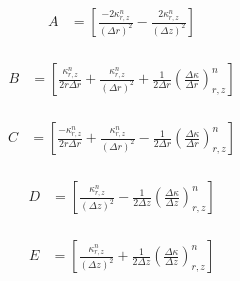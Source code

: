 \documentclass[12pt]{article}
\begin{document}
		
		\begin{equation}
		\begin{aligned}
		A &= \left [\frac{-2\kappa^n_{r, z}}{(\Delta r)^2} -\frac{2\kappa^n_{r, z}}{(\Delta z)^2}  \right ] \\
		\end{aligned}
		\end{equation}
		
		\begin{equation}
		\begin{aligned}
		B &= \left [\frac{\kappa^n_{r, z}}{2r\Delta r} + \frac{\kappa^n_{r, z}}{(\Delta r)^2} + \frac{1}{2\Delta r}(\frac{\Delta\kappa}{\Delta r})^n_{r, z} \right ] \\
		\end{aligned}
		\end{equation}
		
		\begin{equation}
		\begin{aligned}
		C &= \left [\frac{-\kappa^n_{r, z}}{2r\Delta r} + \frac{\kappa^n_{r, z}}{(\Delta r)^2} - \frac{1}{2\Delta r}(\frac{\Delta\kappa}{\Delta r})^n_{r, z} \right ] \\
		\end{aligned}
		\end{equation}
		
		\begin{equation}
		\begin{aligned}
		D &= \left [\frac{\kappa^n_{r, z}}{(\Delta z)^2} - \frac{1}{2\Delta z}(\frac{\Delta\kappa}{\Delta z})^n_{r, z}  \right ] \\
		\end{aligned}
		\end{equation}
		
		\begin{equation}
		\begin{aligned}
		E &= \left [ \frac{\kappa^n_{r, z}}{(\Delta z)^2} + \frac{1}{2\Delta z}(\frac{\Delta\kappa}{\Delta z})^n_{r, z} \right ] \\
		\end{aligned}
		\end{equation}
		
\end{document}
